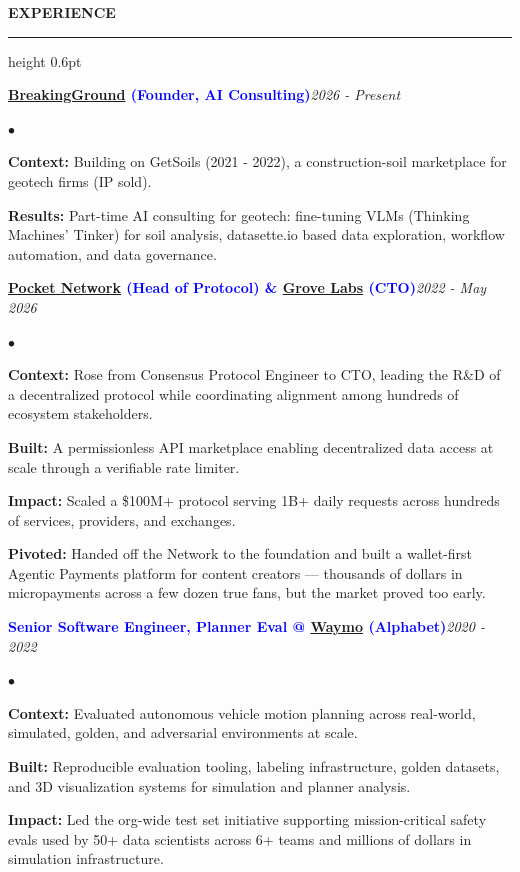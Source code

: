 \documentclass[10pt]{resume}
\newenvironment{rSectionCompact}[1]{
  \medskip
  \vspace{0.5em}
  \textbf{\textcolor{Cerulean}{\MakeUppercase{#1}}}
  \vspace{0.3em}
  {\color{Blue}\hrule height 0.6pt}
  \vspace{0.6em}
  \begin{list}{}{
    \setlength{\leftmargin}{0em}
  }
  \item[]
}{
    \vspace{0.35em}
    \end{list}
}
\newenvironment{rJobCompact}[2]{
  \normalsize
  \textcolor{Blue}{\textbf{#1}}\hfill\textit{#2}
  \vspace{0.08em}
  \begin{list}{$\bullet$}{
    \setlength{\leftmargin}{1.6em}
    \setlength{\itemsep}{-0.05em}
    \setlength{\topsep}{0pt}
    \setlength{\partopsep}{0pt}
    \setlength{\parsep}{0pt}
  }
}{
    \end{list}
    \vspace{0.55em}
}
\begin{document}
\begin{rSectionCompact}{Experience}

    \begin{rJobCompact}{\href{https://breakingground.tech}{BreakingGround} (Founder, AI Consulting)}{2026 - Present}
        \item \textbf{Context:} Building on GetSoils (2021 - 2022), a construction-soil marketplace for geotech firms (IP sold).
        \item \textbf{Results:} Part-time AI consulting for geotech: fine-tuning VLMs (Thinking Machines' Tinker) for soil analysis, datasette.io based data exploration, workflow automation, and data governance.
    \end{rJobCompact}

    \begin{rJobCompact}{\href{https://pokt.network}{Pocket Network} (Head of Protocol) \& \href{https://grove.city}{Grove Labs} (CTO)}{2022 - May 2026}
        \item \textbf{Context:} Rose from Consensus Protocol Engineer to CTO, leading the R\&D of a decentralized protocol while coordinating alignment among hundreds of ecosystem stakeholders.
        \item \textbf{Built:} A permissionless API marketplace enabling decentralized data access at scale through a verifiable rate limiter.
        \item \textbf{Impact:} Scaled a \$100M+ protocol serving 1B+ daily requests across hundreds of services, providers, and exchanges.
        \item \textbf{Pivoted:} Handed off the Network to the foundation and built a wallet-first Agentic Payments platform for content creators — thousands of dollars in micropayments across a few dozen true fans, but the market proved too early.
    \end{rJobCompact}

    \begin{rJobCompact}{Senior Software Engineer, Planner Eval @ \href{https://waymo.com}{Waymo} (Alphabet)}{2020 - 2022}
        \item \textbf{Context:} Evaluated autonomous vehicle motion planning across real-world, simulated, golden, and adversarial environments at scale.
        \item \textbf{Built:} Reproducible evaluation tooling, labeling infrastructure, golden datasets, and 3D visualization systems for simulation and planner analysis.
        \item \textbf{Impact:} Led the org-wide test set initiative supporting mission-critical safety evals used by 50+ data scientists across 6+ teams and millions of dollars in simulation infrastructure.
    \end{rJobCompact}


\end{rSectionCompact}
\end{document}
